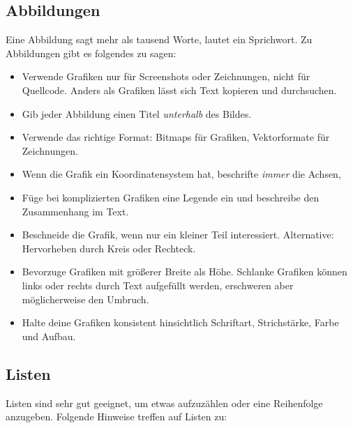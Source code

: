 \documentclass[a4paper,titlepage=true,twoside]{scrartcl}
\newcommand{\latexenv}[1]{\textsf{#1}}
\begin{document}
\subsection{Abbildungen}
Eine Abbildung sagt mehr als tausend Worte, lautet ein Sprichwort. Zu Abbildungen
gibt es folgendes zu sagen:

\begin{itemize}
 \item Verwende Grafiken nur für Screenshots oder Zeichnungen, nicht für Quellcode.
  Anders als Grafiken lässt sich Text kopieren und durchsuchen.
 \item Gib jeder Abbildung einen Titel \emph{unterhalb} des Bildes.
 \item Verwende das richtige Format: Bitmaps für Grafiken, Vektorformate für Zeichnungen.
 \item Wenn die Grafik ein Koordinatensystem hat, beschrifte \emph{immer} die Achsen,
 \item Füge bei komplizierten Grafiken eine Legende ein und beschreibe den Zusammenhang
      im Text.
 \item Beschneide die Grafik, wenn nur ein kleiner Teil interessiert. Alternative:
  Hervorheben durch Kreis oder Rechteck.
 \item Bevorzuge Grafiken mit größerer Breite als Höhe. Schlanke Grafiken können links
  oder rechts durch Text aufgefüllt werden, erschweren aber möglicherweise den Umbruch.
 \item Halte deine Grafiken konsistent hinsichtlich Schriftart, Strichstärke,
  Farbe und Aufbau.
\end{itemize}



\subsection{Listen}
Listen sind sehr gut geeignet, um etwas aufzuzählen oder eine Reihenfolge anzugeben.
Folgende Hinweise treffen auf Listen zu:
\end{document}
